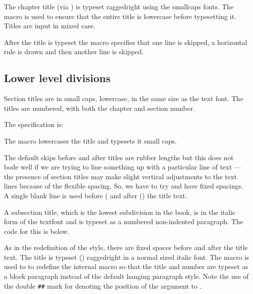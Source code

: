 The chapter title (via \cmd{\printchaptertitle}) 
is typeset raggedright using the \cmd{\Large} smallcaps fonts. The 
\cmd{\MakeLowercase} macro is used to ensure that the entire title is 
lowercase before typesetting it. Titles are input in mixed case.

    After the title is typeset the \cmd{\afterchaptertitle} macro
specifies that one line is skipped, a horizontal rule
is drawn and then another line is skipped.

\subsection{Lower level divisions}

    Section titles are in small caps, lowercase, in the same size as the
text font. The titles are numbered, with both the chapter and section number.

The specification is:
\begin{lcode}
\setsecheadstyle{\raggedright\scshape\MakeLowercase}
  \setbeforesecskip{-\onelineskip}
  \setaftersecskip{\onelineskip}
\end{lcode}

    The macro \cmd{\setsecheadstyle} lowercases the title and typesets it
small caps. 

The default skips before and after titles are rubber lengths but this does
not bode well if we are trying to line something up with a particular line
of text --- the presence of section titles may make slight vertical 
adjustments to the text lines because of the flexible spacing. So, we have
to try and have fixed spacings.
A single blank line is used before (\cmd{\setbeforesecskip)}
and after (\cmd{\setaftersecskip}) the title text. 

    A subsection title, which is the lowest subdivision in the book, is in
the italic form of the textfont and is typeset as a numbered non-indented
paragraph. The code for this is below.

\begin{lcode}
  \setbeforesubsecskip{-\onelineskip}
  \setaftersubsecskip{\onelineskip}
\end{lcode}

    As in the redefinition of the \cmd{\section} style, there are fixed
spaces before and after the title text. The title is typeset 
(\cmd{\setsubsecheadstyle}) raggedright in a normal sized italic font.
The macro \cmd{\sethangfrom} is used to to redefine the internal
\cmd{\@hangfrom} macro so that the title and number are typeset as a block 
paragraph instead of the default hanging 
paragraph style. Note the use of
the double \verb?##? mark for denoting the position of the argument to 
\cmd{\@hangfrom}.

